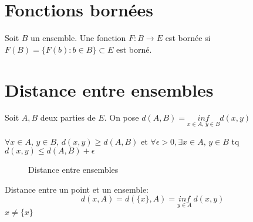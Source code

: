 \section{Fonctions bornées}
\begin{definition}
    Soit $B$ un ensemble. Une fonction  $F: B \to E$ est bornée si $F(B) = \{ F(b): b \in B\} \subset E$ est borné.
\end{definition}
\section{Distance entre ensembles}
\begin{definition}
    Soit $A, B$ deux parties de  $E$. On pose  $d(A, B) = \underset{ x \in A, \, y \in B}{inf} d(x, y)$
\end{definition}
\begin{property}
   $\forall x \in A, \, y \in B, \, d(x, y) \ge d(A, B)$ et $\forall \epsilon > 0, \exists x \in A, \, y \in B$ tq $d(x, y) \le d(A, B) + \epsilon$
\end{property}
\begin{figure}[ht]
    \centering
    \caption{Distance entre ensembles}
    \label{fig:distance-entre-ensembles}
\end{figure}
\begin{definition}
    Distance entre un point et un ensemble:
    \[
        d(x, A) = d(\{x\}, A) = \underset{y \in A}{inf}\: d(x, y)
    \] 
    $x \neq \{x\}$
\end{definition}

